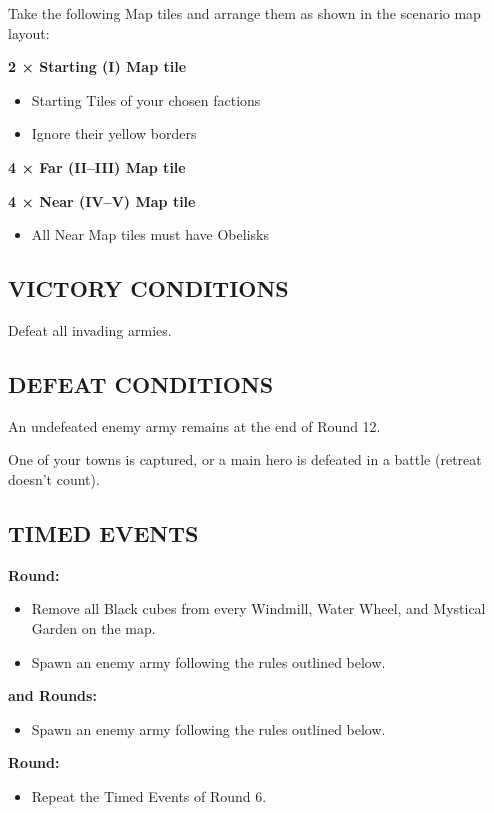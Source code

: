 \begin{multicols}{2}
Take the following Map tiles and arrange them as shown in the scenario map layout:

\textbf{2 × Starting (I) Map tile}
\begin{itemize}
  \item Starting Tiles of your chosen factions
  \item Ignore their yellow borders
\end{itemize}

\textbf{4 × Far (II--III) Map tile}

\textbf{4 × Near (IV--V) Map tile}
\begin{itemize}
  \item All Near Map tiles must have Obelisks
\end{itemize}

\subsection*{\MakeUppercase{Victory Conditions}}

Defeat all invading armies.

\subsection*{\MakeUppercase{Defeat Conditions}}

An undefeated enemy army remains at the end of Round 12.

One of your towns is captured, or a main hero is defeated in a battle (retreat doesn't count).

\subsection*{\MakeUppercase{Timed Events}}

\textbf{ Round:}
\begin{itemize}
  \item Remove all Black cubes from every Windmill, Water Wheel, and Mystical Garden on the map.
  \item Spawn an enemy army following the rules outlined below.
\end{itemize}

\textbf{ and  Rounds:}
\begin{itemize}
  \item Spawn an enemy army following the rules outlined below.
\end{itemize}

\textbf{ Round:}
\begin{itemize}
  \item Repeat the Timed Events of Round 6.
\end{itemize}


\end{multicols}
